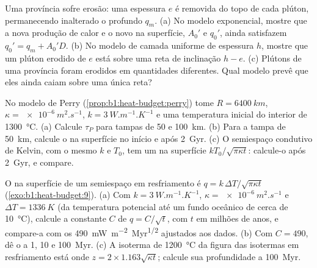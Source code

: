 \begin{exercise}[$\star\star\star$]\label{exo:b1:heat-budget:10}
Uma província sofre erosão: uma espessura $e$ é removida do topo de cada plúton,
permanecendo inalterado o  profundo $q_m$. (a) No modelo exponencial, mostre
que a nova produção de calor e o novo  na superfície, $A_0'$ e $q_0'$, ainda
satisfazem $q_0' = q_m + A_0'D$. (b) No modelo de camada uniforme de espessura $h$,
mostre que um plúton erodido de $e$ está sobre uma reta de inclinação $h - e$. (c) Plútons de
uma província foram erodidos em quantidades diferentes. Qual modelo prevê que eles
ainda caiam sobre uma única reta?
\end{exercise}

\begin{exercise}[$\star\star\star$]\label{exo:b1:heat-budget:11}
No modelo de Perry (\cref{prop:b1:heat-budget:perry}) tome $R = \qty{6400}{km}$,
$\kappa = \qty{e-6}{m^2.s^{-1}}$, $k = \qty{3}{W.m^{-1}.K^{-1}}$ e uma temperatura inicial
do interior de \qty{1300}{\degreeCelsius}. (a) Calcule $\tau_P$ para
tampas de 50 e \qty{100}{km}. (b) Para a tampa de \qty{50}{km}, calcule o 
na superfície no início e após \qty{2}{Gyr}. (c) O semiespaço condutivo de Kelvin, com o mesmo $k$ e $T_0$,
tem um  na superfície
$kT_0/\sqrt{\pi\kappa t}$: calcule-o após \qty{2}{Gyr}, e compare.
\end{exercise}

\begin{exercise}[$\star\star\star$]\label{exo:b1:heat-budget:12}
O  na superfície de um semiespaço em resfriamento é $q = k\,\Delta T/\sqrt{\pi\kappa t}$
(\cref{exo:b1:heat-budget:9}). (a) Com $k = \qty{3}{W.m^{-1}.K^{-1}}$, $\kappa =
\qty{e-6}{m^2.s^{-1}}$ e $\Delta T = \qty{1336}{K}$ (da temperatura potencial
até um fundo oceânico de cerca de \qty{10}{\degreeCelsius}), calcule a
constante $C$ de $q = C/\sqrt t$, com $t$ em milhões de anos, e compare-a
com os \qty{490}{mW.m^{-2}.Myr^{1/2}} ajustados aos dados. (b) Com
$C = 490$, dê o  a 1, 10 e \qty{100}{Myr}. (c) A
isoterma de \qty{1200}{\degreeCelsius} da figura das isotermas em resfriamento está
onde $z = 2\times1.163\sqrt{\kappa t}$; calcule sua profundidade a \qty{100}{Myr}.
\end{exercise}

